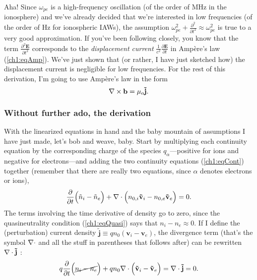 Aha! Since $\omega_{pe}$ is a high-frequency oscillation (of the order of MHz in
the ionosphere) and we've already decided that we're interested in low
frequencies (of the order of Hz for ionospheric IAWs), the assumption
$\omega_{pe}^2 + \frac{\partial^2}{\partial t^2} \approx \omega_{pe}^2$ is true
to a very good approximation. If you've been following closely, you know that
the term $\frac{\partial^2 \mathbf{E}}{\partial t^2}$ corresponds to the
\emph{displacement current} $\frac{1}{c^2} \frac{\partial \mathbf{E}}{\partial t}$ in
Amp\`{e}re's law (\ref{ch1:eqAmp}). We've just shown that (or rather, I have
just sketched how) the displacement current is negligible for low
frequencies. For the rest of this derivation, I'm going to use Amp\`{e}re's law
in the form
\begin{equation}
  {\bf \nabla} \times \mathbf{b} = \mu_o \mathbf{\tilde j}.
\end{equation}



\subsubsection{Without further ado, the derivation}

With the linearized equations in hand and the baby mountain of assumptions I
have just made, let's bob and weave, baby. Start by multiplying each continuity
equation by the corresponding charge of the species $q_\alpha$---positive for
ions and negative for electrons---and adding the two continuity equations
(\ref{ch1:eqCont}) together (remember that there are really two equations, since
$\alpha$ denotes electrons or ions),
\begin{equation} \label{ch1:eqCont1} \dfrac{\partial}{\partial t} \Big (
  \tilde n_i - \tilde n_e \Big ) + {\bf \nabla} \cdot \Big (n_{0,i} \mathbf{\tilde v}_i - n_{0,e}
  \mathbf{\tilde v}_{e} \Big ) = 0.
\end{equation}
The terms involving the time derivative of density go to zero, since the
quasineutrality condition (\ref{ch1:eqQuasi}) says that $n_i - n_e \approx
0$. If I define the (perturbation) current density
$\mathbf{\tilde j} \equiv q n_0 ( \mathbf{v}_i - \mathbf{v}_e )$, the divergence
term (that's the symbol ${\bf \nabla} \cdot$ and all the stuff in parentheses that
follows after) can be rewritten ${\bf \nabla} \cdot \mathbf{\tilde j}$ :
\begin{equation*} 
  q\dfrac{\partial}{\partial t} \Big ( \cancel{n_i - n_e} \Big )
  + q n_0 {\bf \nabla} \cdot \Big ( \mathbf{\tilde v}_i - \mathbf{\tilde v}_{e} \Big ) = {\bf \nabla}
  \cdot \mathbf{\tilde j} = 0.
\end{equation*}

